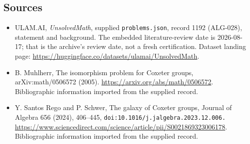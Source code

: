 \documentclass[11pt,a4paper]{article}
\begin{document}
\subsection{Sources}

{\small

\begin{itemize}

\item[\hypertarget{source:1192:1}{S1}] ULAM.AI, \emph{UnsolvedMath}, supplied \texttt{problems.json}, record 1192 (ALG-028), statement and background. The embedded literature-review date is 2026-08-17; that is the archive’s review date, not a fresh certification. Dataset landing page: \url{https://huggingface.co/datasets/ulamai/UnsolvedMath}.

\item[\hypertarget{source:1192:2}{S2}] B. Muhlherr, The isomorphism problem for Coxeter groups, arXiv:math/0506572 (2005). \url{https://arxiv.org/abs/math/0506572}. Bibliographic information imported from the supplied record.

\item[\hypertarget{source:1192:3}{S3}] Y. Santos Rego and P. Schwer, The galaxy of Coxeter groups, Journal of Algebra 656 (2024), 406--445, \nolinkurl{doi:10.1016/j.jalgebra.2023.12.006.} \url{https://www.sciencedirect.com/science/article/pii/S0021869323006178}. Bibliographic information imported from the supplied record.

\end{itemize}

}

\label{end:1192}
\end{document}
